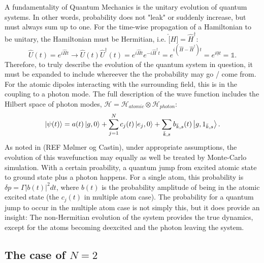 \documentclass{article}
\begin{document}
A fundamentality of Quantum Mechanics is the unitary evolution of quantum systems. In other words, probability does not "leak" or suddenly increase, but must always sum up to one. For the time-wise propagation of a Hamiltonian to be unitary, the Hamiltonian must be Hermitian, i.e. $\hat[H] = \hat{H}^\dagger$:
\begin{equation}\label{eq:unitarity}
    \hat{U}(t) = e^{i \hat{H} t} \rightarrow \hat{U}(t) \hat{U}^\dagger(t) = e^{i \hat{H} t} e^{-i \hat{H}^\dagger t} = e^{i(\hat{H}-\hat{H}^\dagger) t} = e^{i \underline{0} t} = \mathds{1}.
\end{equation}
Therefore, to truly describe the evolution of the quantum system in question, it must be expanded to include whereever the the probability may go / come from. For the atomic dipoles interacting with the surrounding field, this is in the coupling to a photon mode. The full description of the wave function includes the Hilbert space of photon modes, $\mathscr{H} = \mathscr{H}_{atomic} \otimes \mathscr{H}_{photon}$:
\begin{equation}\label{eq:full_wave_function}
    \ket{\psi(t)} = a(t) \ket{g, 0} + \sum_{j=1}^N c_j(t) \ket{e_j, 0} + \sum_{\bar{k},s} b_{\bar{k},s} (t) \ket{g, 1_{\bar{k},s}}.
\end{equation}
As noted in (REF Mølmer og Castin), under appropriate assumptions, the evolution of this wavefunction may equally as well be treated by Monte-Carlo simulation. With a certain proability, a quantum jump from excited atomic state to ground state plus a photon happens. For a single atom, this probability is $\delta p = \Gamma |b(t)|^2 dt$, where $b(t)$ is the probability amplitude of being in the atomic excited state (the $c_j (t)$ in multiple atom case). The probability for a quantum jump to occur in the multiple atom case is not simply this, but it does provide an insight: The non-Hermitian evolution of the system provides the true dynamics, except for the atoms becoming deexcited and the photon leaving the system. 

\subsection{The case of $N=2$}\label{sec:N2}
\end{document}
